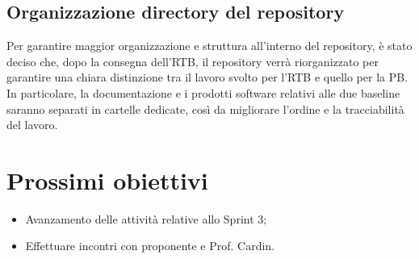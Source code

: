 \subsection{Organizzazione directory del repository}
Per garantire maggior organizzazione e struttura all'interno del repository, è stato deciso che, dopo la consegna dell'RTB, il repository verrà riorganizzato per garantire una chiara distinzione tra il lavoro svolto per l'RTB e quello per la PB. \\In particolare, la documentazione e i prodotti software relativi alle due baseline saranno separati in cartelle dedicate, così da migliorare l'ordine e la tracciabilità del lavoro.

\section{Prossimi obiettivi}
   \begin{itemize}
        \item Avanzamento delle attività relative allo Sprint 3;
        \item Effettuare incontri con proponente e Prof. Cardin.
    \end{itemize}